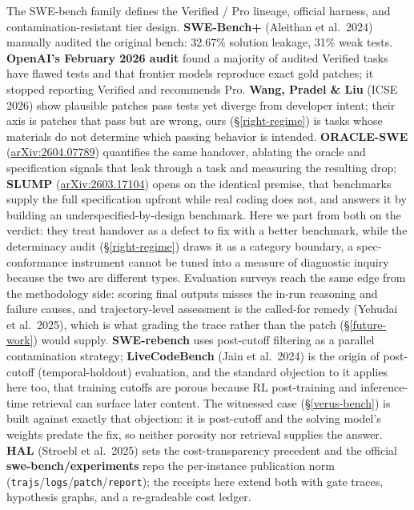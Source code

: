 \documentclass[
  10pt,
]{article}
\begin{document}
The SWE-bench family defines the Verified / Pro lineage, official
harness, and contamination-resistant tier design. \textbf{SWE-Bench+}
(Aleithan et al.~2024) manually audited the original bench: 32.67\%
solution leakage, 31\% weak tests. \textbf{OpenAI's February 2026 audit}
found a majority of audited Verified tasks have flawed tests and that
frontier models reproduce exact gold patches; it stopped reporting
Verified and recommends Pro. \textbf{Wang, Pradel \& Liu} (ICSE 2026)
show plausible patches pass tests yet diverge from developer intent;
their axis is patches that pass but are wrong, ours
(\S\ref{right-regime}) is tasks whose materials do not determine which
passing behavior is intended. \textbf{ORACLE-SWE}
(\href{https://arxiv.org/abs/2604.07789}{arXiv:2604.07789}) quantifies
the same handover, ablating the oracle and specification signals that
leak through a task and measuring the resulting drop; \textbf{SLUMP}
(\href{https://arxiv.org/abs/2603.17104}{arXiv:2603.17104}) opens on the
identical premise, that benchmarks supply the full specification upfront
while real coding does not, and answers it by building an
underspecified-by-design benchmark. Here we part from both on the
verdict: they treat handover as a defect to fix with a better benchmark,
while the determinacy audit (\S\ref{right-regime}) draws it as a
category boundary, a spec-conformance instrument cannot be tuned into a
measure of diagnostic inquiry because the two are different types.
Evaluation surveys reach the same edge from the methodology side:
scoring final outputs misses the in-run reasoning and failure causes,
and trajectory-level assessment is the called-for remedy (Yehudai et
al.~2025), which is what grading the trace rather than the patch
(\S\ref{future-work}) would supply. \textbf{SWE-rebench} uses
post-cutoff filtering as a parallel contamination strategy;
\textbf{LiveCodeBench} (Jain et al.~2024) is the origin of post-cutoff
(temporal-holdout) evaluation, and the standard objection to it applies
here too, that training cutoffs are porous because RL post-training and
inference-time retrieval can surface later content. The witnessed case
(\S\ref{verus-bench}) is built against exactly that objection: it is
post-cutoff and the solving model's weights predate the fix, so neither
porosity nor retrieval supplies the answer. \textbf{HAL} (Stroebl et
al.~2025) sets the cost-transparency precedent and the official
\textbf{swe-bench/experiments} repo the per-instance publication norm
(\texttt{trajs}/\texttt{logs}/\texttt{patch}/\texttt{report}); the
receipts here extend both with gate traces, hypothesis graphs, and a
re-gradeable cost ledger.
\end{document}
